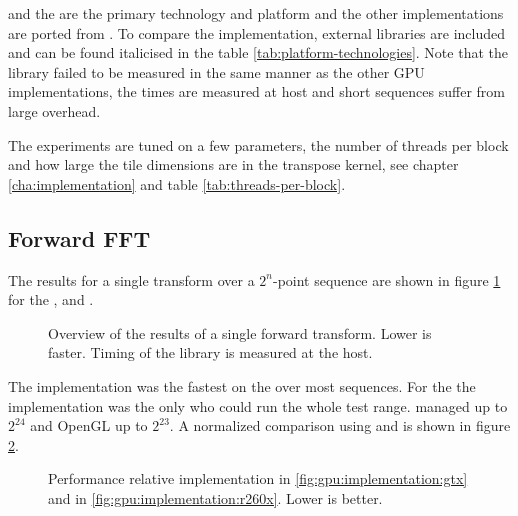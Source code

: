 {\CU} and the {\NVCARD} are the primary technology and platform and the other implementations are ported from {\CU}. To compare the implementation, external libraries are included and can be found italicised in the table \ref{tab:platform-technologies}. Note that the {\CLFFT} library failed to be measured in the same manner as the other GPU implementations, the times are measured at host and short sequences suffer from large overhead.

The experiments are tuned on a few parameters, the number of threads per block and how large the tile dimensions are in the transpose \gls{kernel}, see chapter \ref{cha:implementation} and table \ref{tab:threads-per-block}.

\subsection{Forward FFT}

The results for a single transform over a $2^{n}$-point sequence are shown in figure \ref{fig:gpu:overview} for the {\NVCARD}, {\AMDCARD} and {\INTELCPU}.

\begin{figure}[!htbp]
	\centering
	\subfloat[\NVCARD]{	
		
	}
	\vfill
	\subfloat[\AMDCARD]{
		
	}
	\caption{Overview of the results of a single forward transform. Lower is faster. Timing of the {\CLFFT} library is measured at the host.}
	\label{fig:gpu:overview}
\end{figure}

The {\CU} implementation was the fastest on the {\NVCARD} over most sequences. For the {\AMDCARD} the {\OCL} implementation was the only who could run the whole test range. {\DX} managed up to $2^{24}$ and OpenGL up to $2^{23}$. A normalized comparison using {\CU} and {\OCL} is shown in figure \ref{fig:gpu:implementation}.

\begin{figure}[!htbp]
	\centering
	\subfloat[\NVCARD\label{fig:gpu:implementation:gtx}]{	
		
	}
	\vfill
	\subfloat[\AMDCARD\label{fig:gpu:implementation:r260x}]{
		
	}	
	\caption{Performance relative {\CU} implementation in \ref{fig:gpu:implementation:gtx} and {\OCL} in \ref{fig:gpu:implementation:r260x}. Lower is better.}
	\label{fig:gpu:implementation}
\end{figure}

